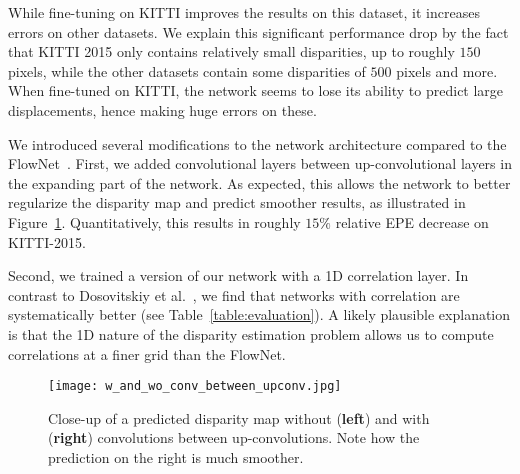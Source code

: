 \documentclass[10pt,twocolumn,letterpaper]{article}
\begin{document}
While fine-tuning on KITTI improves the results on this dataset, it increases errors on other datasets.
We explain this significant performance drop by the fact that KITTI 2015 only contains relatively small disparities, up to roughly $150$ pixels, while the other datasets contain some disparities of $500$ pixels and more. 
When fine-tuned on KITTI, the network seems to lose its ability to predict large displacements, hence making huge errors on these.

We introduced several modifications to the network architecture compared to the FlowNet~\cite{FlowNet}.
First, we added convolutional layers between up-convolutional layers in the expanding part of the network. 
As expected, this allows the network to better regularize the disparity map and predict smoother results, as illustrated in Figure~\ref{fig:interconv}. 
Quantitatively, this results in roughly $15 \%$ relative EPE decrease on KITTI-2015.

Second, we trained a version of our network with a 1D correlation layer. 
In contrast to Dosovitskiy et al.~\cite{FlowNet}, we find that networks with correlation are systematically better (see Table~\ref{table:evaluation}).
A likely plausible explanation is that the 1D nature of the disparity estimation problem allows us to compute correlations at a finer grid than the FlowNet. 

\begin{figure}
\texttt{[image: w\_and\_wo\_conv\_between\_upconv.jpg]}
\caption{Close-up of a predicted disparity map without (\textbf{left}) and with (\textbf{right}) convolutions between up-convolutions. Note how the prediction on the right is much smoother.}
\label{fig:interconv}
\end{figure}
\end{document}

